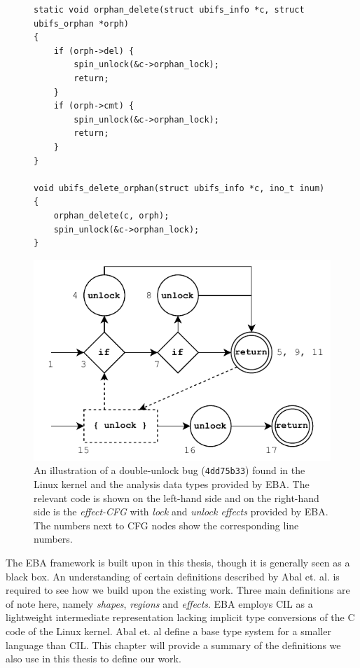\begin{figure}[H]
\centering
\begin{minipage}{0.4\textwidth}
    \begin{verbatim}
static void orphan_delete(struct ubifs_info *c, struct ubifs_orphan *orph)
{
	if (orph->del) {
		spin_unlock(&c->orphan_lock);
		return;
	}
	if (orph->cmt) {
		spin_unlock(&c->orphan_lock);
		return;
	}
}

void ubifs_delete_orphan(struct ubifs_info *c, ino_t inum)
{
	orphan_delete(c, orph);
	spin_unlock(&c->orphan_lock);
}
\end{verbatim}
\end{minipage}
\hspace*{0.05\textwidth}
\begin{minipage}{0.45\textwidth}
    \includegraphics[width=\textwidth]{background/figures/annotated-cfg}
\end{minipage}
\caption{An illustration of a double-unlock bug (\texttt{4dd75b33}) found in the Linux kernel and the analysis data types provided by EBA. The relevant code is shown on the left-hand side and on the right-hand side is the \textit{effect-CFG} with \textit{lock} and \textit{unlock effects} provided by EBA. The numbers next to CFG nodes show the corresponding line numbers.}
\label{initial-bug-visualisation}
\end{figure}

\newpar The EBA framework is built upon in this thesis, though it is generally seen as a black box. An understanding of certain definitions described by Abal et. al. \cite{Abal2017EffectiveBF} is required to see how we build upon the existing work. Three main definitions are of note here, namely \textit{shapes}, \textit{regions} and \textit{effects}. EBA employs CIL \cite{cil} as a lightweight intermediate representation lacking implicit type conversions of the C code of the Linux kernel. Abal et. al define a base type system for a smaller language than CIL. This chapter will provide a summary of the definitions we also use in this thesis to define our work. 

